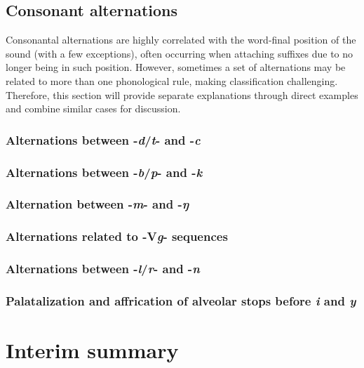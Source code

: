 \subsection{Consonant alternations}

Consonantal alternations are highly correlated with the word-final position of the sound (with a few exceptions), often occurring when attaching suffixes due to no longer being in such position. However, sometimes a set of alternations may be related to more than one phonological rule, making classification challenging. Therefore, this section will provide separate explanations through direct examples and combine similar cases for discussion.

\subsubsection{Alternations between -\textit{d}/\textit{t}- and -\textit{c}}
\lipsum[1-3]

\subsubsection{Alternations between -\textit{b}/\textit{p}- and -\textit{k}}
\lipsum[1-3]

\subsubsection{Alternation between -\textit{m}- and -\textit{ŋ}}
\lipsum[1-3]

\subsubsection{Alternations related to -V\textit{g}- sequences}
\lipsum[1-3]

\subsubsection{Alternations between -\textit{l}/\textit{r}- and -\textit{n}}
\lipsum[1-3]

\subsubsection{Palatalization and affrication of alveolar stops before \textit{i} and \textit{y}}
\lipsum[1-3]






\section{Interim summary}
\lipsum[1-2]